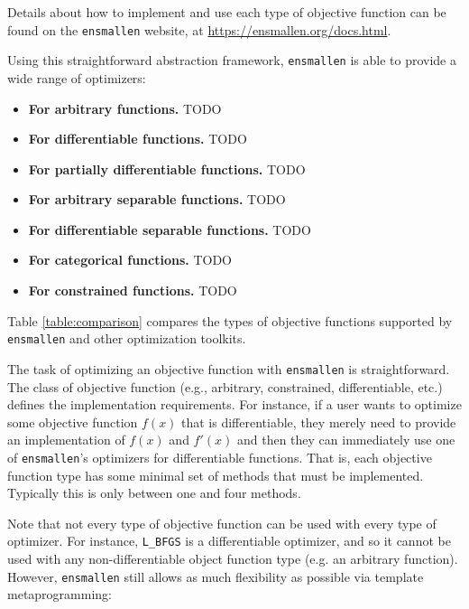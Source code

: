 Details about how to implement and use each type of objective function can be
found on the {\tt ensmallen} website, at \url{https://ensmallen.org/docs.html}.

Using this straightforward abstraction framework, {\tt ensmallen} is able to
provide a wide range of optimizers:

\begin{itemize}
  \item {\bf For arbitrary functions.}  TODO

  \item {\bf For differentiable functions.}  TODO

  \item {\bf For partially differentiable functions.}  TODO

  \item {\bf For arbitrary separable functions.}  TODO

  \item {\bf For differentiable separable functions.}  TODO

  \item {\bf For categorical functions.}  TODO

  \item {\bf For constrained functions.}  TODO
\end{itemize}

Table \ref{table:comparison} compares the types of objective functions supported
by {\tt ensmallen} and other optimization toolkits.

The task of optimizing an objective function with {\tt ensmallen} is
straightforward.  The class of objective function (e.g., arbitrary, constrained,
differentiable, etc.) defines the implementation requirements.  For instance, if
a user wants to optimize some objective function $f(x)$ that is differentiable,
they merely need to provide an implementation of $f(x)$ and $f'(x)$ and then
they can immediately use one of {\tt ensmallen}'s optimizers for differentiable
functions.  That is, each objective function type has some minimal set of
methods that must be implemented.  Typically this is only between one and four
methods.

Note that not every type of objective function can be used with every type of
optimizer.  For instance, {\tt L\_BFGS} is a differentiable optimizer, and so it
cannot be used with any non-differentiable object function type (e.g. an
arbitrary function).  However, {\tt ensmallen} still allows as much flexibility
as possible via template metaprogramming:

